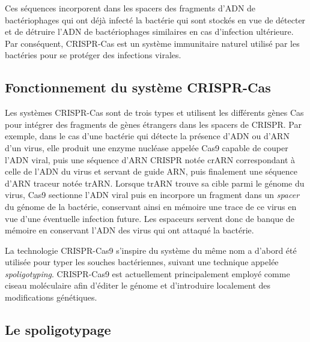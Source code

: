 \documentclass[twoside,a4paper,11pt,frenchb,openany]{report}
\begin{document}
Ces séquences incorporent dans les spacers des fragments d'ADN de bactériophages qui ont déjà infecté la bactérie qui sont stockés en vue de détecter et de détruire l'ADN de bactériophages similaires en cas d'infection ultérieure. Par conséquent, CRISPR-Cas est un système immunitaire naturel utilisé par les bactéries pour se protéger des infections virales. 


\subsection{Fonctionnement du système CRISPR-Cas}

Les systèmes CRISPR-Cas sont de trois types et utilisent les différents gènes Cas pour intégrer des fragments de gènes étrangers dans les spacers de CRISPR. Par exemple, dans le cas d'une bactérie qui détecte la présence d'ADN ou d'ARN d'un virus, elle produit une enzyme nucléase appelée Cas9 capable de couper l'ADN viral, puis une séquence d'ARN CRISPR notée crARN correspondant à celle de l'ADN du virus et servant de guide ARN, puis finalement une séquence d'ARN traceur notée trARN. Lorsque trARN trouve sa cible parmi le génome du virus, Cas9 sectionne l'ADN viral puis en incorpore un fragment dans un \textit{spacer} du génome de la bactérie, conservant ainsi en mémoire une trace de ce virus en vue d'une éventuelle infection future. Les espaceurs servent donc de banque de mémoire en conservant l'ADN des virus qui ont attaqué la bactérie.

La technologie CRISPR-Cas9 s'inspire du système du même nom a d'abord été utilisée pour typer les souches bactériennes, suivant une technique appelée \textit{spoligotyping}. CRISPR-Cas9 est actuellement principalement employé comme ciseau moléculaire afin d'éditer le génome et d'introduire localement des modifications génétiques.


\subsection{Le spoligotypage}
\end{document}
